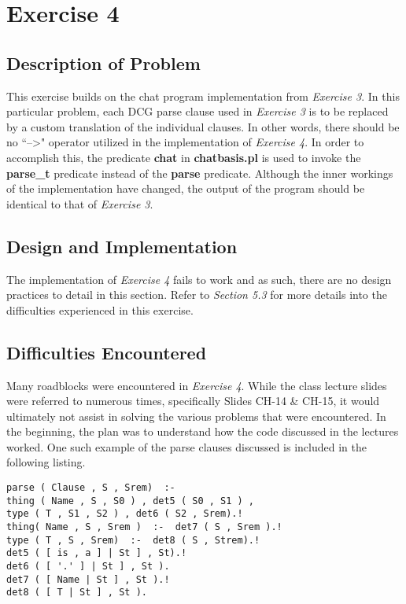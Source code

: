 \documentclass[11pt]{article}
\newcommand{\forceindent}{\leavevmode{\parindent=1em\indent}}
\begin{document}
\section{Exercise 4}
	\subsection{Description of Problem}
\forceindent This exercise builds on the chat program implementation from \emph{Exercise 3}. In this particular problem, each DCG parse clause used in \emph{Exercise 3} is to be replaced by a custom translation of the individual clauses. In other words, there should be no ``--\textgreater " operator utilized in the implementation of \emph{Exercise 4}. In order to accomplish this, the predicate \textbf{chat} in \textbf{chatbasis.pl} is used to invoke the \textbf{parse\_t} predicate instead of the \textbf{parse} predicate. Although the inner workings of the implementation have changed, the output of the program should be identical to that of \emph{Exercise 3}.	
	\subsection{Design and Implementation}
\forceindent The implementation of \emph{Exercise 4} fails to work and as such, there are no design practices to detail in this section. Refer to \emph{Section 5.3} for more details into the difficulties experienced in this exercise. 	
	\subsection{Difficulties Encountered}
\forceindent Many roadblocks were encountered in \emph{Exercise 4}. While the class lecture slides were referred to numerous times, specifically Slides CH-14 \& CH-15, it would ultimately not assist in solving the various problems that were encountered. In the beginning, the plan was to understand how the code discussed in the lectures worked. One such example of the parse clauses discussed is included in the following listing. 
\begin{lstlisting}[caption= Lecture Example, label= Listing 16]
parse ( Clause , S , Srem)  :-
thing ( Name , S , S0 ) , det5 ( S0 , S1 ) ,
type ( T , S1 , S2 ) , det6 ( S2 , Srem).!
thing( Name , S , Srem )  :-  det7 ( S , Srem ).!
type ( T , S , Srem)  :-  det8 ( S , Strem).!
det5 ( [ is , a ] | St ] , St).!
det6 ( [ '.' ] | St ] , St ).
det7 ( [ Name | St ] , St ).!
det8 ( [ T | St ] , St ).				
\end{lstlisting}
\end{document}
